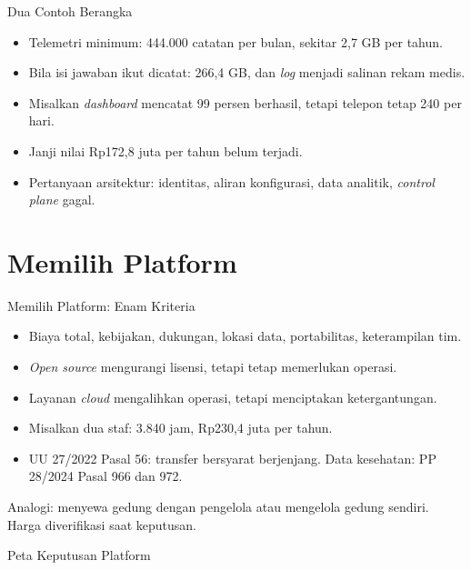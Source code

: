 \documentclass[aspectratio=169, table, 12pt]{beamer}
\begin{document}
\begin{frame}{{\Large Dua Contoh Berangka}}
  \vspace{8pt}
  \begin{itemize}
    \item Telemetri minimum: 444.000 catatan per bulan, sekitar 2,7 GB per tahun.
    \item Bila isi jawaban ikut dicatat: 266,4 GB, dan \textit{log} menjadi salinan rekam medis.
    \item Misalkan \textit{dashboard} mencatat 99 persen berhasil, tetapi telepon tetap 240 per hari.
    \item Janji nilai Rp172,8 juta per tahun belum terjadi.
    \item Pertanyaan arsitektur: identitas, aliran konfigurasi, data analitik, \textit{control plane} gagal.
  \end{itemize}
\end{frame}

\section{Memilih Platform}

\begin{frame}{{\Large Memilih Platform: Enam Kriteria}}
  \vspace{8pt}
  \begin{itemize}
    \item Biaya total, kebijakan, dukungan, lokasi data, portabilitas, keterampilan tim.
    \item \textit{Open source} mengurangi lisensi, tetapi tetap memerlukan operasi.
    \item Layanan \textit{cloud} mengalihkan operasi, tetapi menciptakan ketergantungan.
    \item Misalkan dua staf: 3.840 jam, Rp230,4 juta per tahun.
    \item UU 27/2022 Pasal 56: transfer bersyarat berjenjang. Data kesehatan: PP 28/2024 Pasal 966 dan 972.
  \end{itemize}
  \vspace{6pt}
  {\small Analogi: menyewa gedung dengan pengelola atau mengelola gedung sendiri. Harga diverifikasi saat keputusan.}
\end{frame}

\begin{frame}{{\Large Peta Keputusan Platform}}
  \centering
\end{frame}
\end{document}
